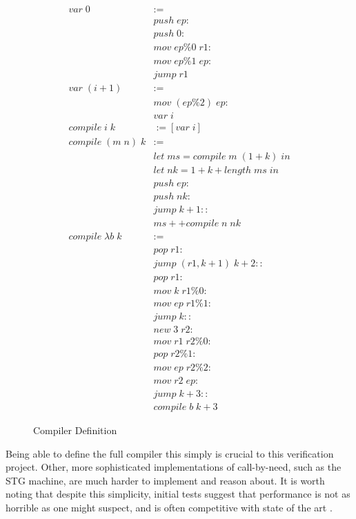 \begin{figure}
\begin{align*}
var \; 0 &:= \\ 
  &push \; ep : \\
  &push \; 0 : \\
  &mov \; ep\%0 \; r1 : \\
  &mov \; ep\%1 \; ep : \\
  &jump \; r1 \\
var \; \left(i+1\right) &:= \\
  &mov \; \left(ep\%2\right) \; ep : \\
  &var \; i \\
compile \; i \; k &:= \left[var \; i\right] \\
compile \; \left( m \; n \right) \; k &:=  \\
  &let \; ms = compile \; m \; \left(1+k\right) \; in \\
  &let \; nk = 1+k+length \; ms \; in \\
  &push \; ep :  \\
  &push \; nk : \\
  &jump \; k+1 :: \\
  &ms ++ compile \; n \; nk \\
compile \; \lambda b \; k &:=  \\
  &pop \; r1 : \\
  &jump \; \left( r1, k+1 \right) \; k+2 :: \\
  &pop \; r1 : \\
  &mov \; k \; r1\%0 : \\
  &mov \; ep \; r1\%1 : \\
  &jump \; k :: \\
  &new \; 3 \; r2 : \\
  &mov \; r1 \; r2\%0 : \\
  &pop \; r2\%1 : \\
  &mov \; ep \; r2\%2 : \\
  &mov \; r2 \; ep : \\
  &jump \; k+3 :: \\
  &compile \; b \; k+3
\end{align*}
\caption{Compiler Definition}
\label{fig:compiler}
\end{figure}

Being able to define the full compiler this simply is crucial to this
verification project. Other, more sophisticated implementations of call-by-need,
such as the STG machine, are much harder to implement and reason about. It is
worth noting that despite this simplicity, initial tests suggest that performance
is not as horrible as one might suspect, and is often competitive with state of
the art \cite{cem}.

